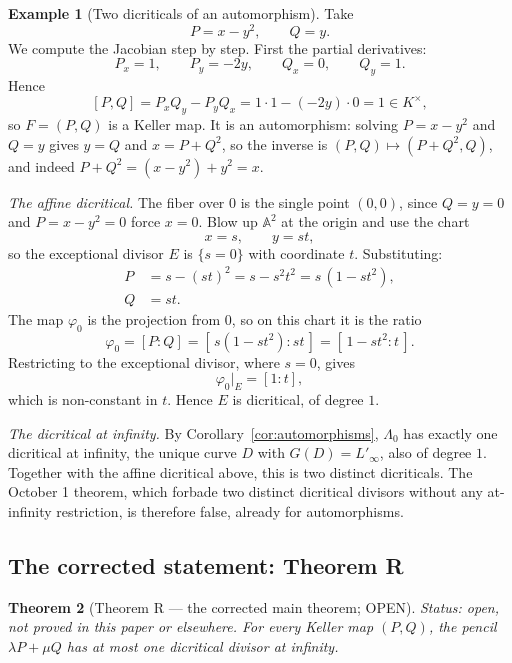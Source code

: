 \documentclass[a4paper,11pt]{article}
\theoremstyle{plain}
\newtheorem{theorem}{Theorem}[section]
\theoremstyle{definition}
\newtheorem{example}[theorem]{Example}
\theoremstyle{remark}
\begin{document}
\begin{example}[Two dicriticals of an automorphism]\label{ex:automorphism}
Take
\begin{equation}\label{eq:auto-map}
P = x - y^2, \qquad Q = y.
\end{equation}
We compute the Jacobian step by step. First the partial derivatives:
\[
P_x = 1, \qquad P_y = -2y, \qquad Q_x = 0, \qquad Q_y = 1.
\]
Hence
\[
[P,Q] = P_x Q_y - P_y Q_x = 1 \cdot 1 - (-2y) \cdot 0 = 1 \in K^\times,
\]
so $F = (P,Q)$ is a Keller map. It is an automorphism: solving $P = x - y^2$ and $Q = y$
gives $y = Q$ and $x = P + Q^2$, so the inverse is $(P,Q) \mapsto (P + Q^2, Q)$, and indeed
$P + Q^2 = (x - y^2) + y^2 = x$.

\emph{The affine dicritical.} The fiber over $0$ is the single point $(0,0)$, since
$Q = y = 0$ and $P = x - y^2 = 0$ force $x = 0$. Blow up $\mathbb{A}^2$ at the origin and
use the chart
\[
x = s, \qquad y = s t,
\]
so the exceptional divisor $E$ is $\{s = 0\}$ with coordinate $t$. Substituting:
\begin{align}
P &= s - (st)^2 = s - s^2 t^2 = s\,(1 - s t^2), \\
Q &= s t.
\end{align}
The map $\varphi_0$ is the projection from $0$, so on this chart it is the ratio
\[
\varphi_0 = [P : Q] = [\,s(1 - s t^2) : s t\,] = [\,1 - s t^2 : t\,].
\]
Restricting to the exceptional divisor, where $s = 0$, gives
\[
\varphi_0|_E = [1 : t],
\]
which is non-constant in $t$. Hence $E$ is dicritical, of degree $1$.

\emph{The dicritical at infinity.} By Corollary~\ref{cor:automorphisms}, $\Lambda_0$ has
exactly one dicritical at infinity, the unique curve $D$ with $G(D) = L'_\infty$, also of
degree $1$. Together with the affine dicritical above, this is two distinct dicriticals.
The October 1 theorem, which forbade two distinct dicritical divisors without any
at-infinity restriction, is therefore false, already for automorphisms.
\end{example}

\subsection{The corrected statement: Theorem R}

\begin{theorem}[Theorem R --- the corrected main theorem; OPEN]\label{thm:R}
\textit{Status: open, not proved in this paper or elsewhere.}
For every Keller map $(P,Q)$, the pencil $\lambda P + \mu Q$ has at most one dicritical
divisor at infinity.
\end{theorem}
\end{document}
